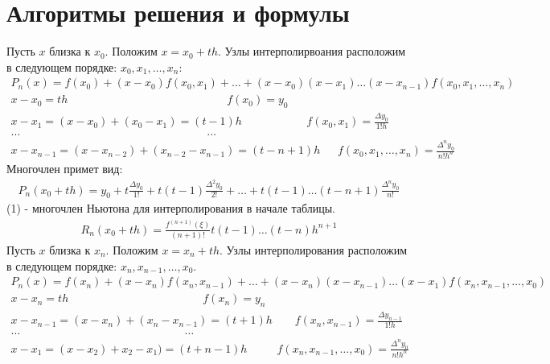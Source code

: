 \documentclass[10pt]{scrartcl}
\begin{document}
\section*{Алгоритмы решения и формулы}\noindent
Пусть $x$ близка к $x_0$. Положим $x = x_0 + th$. Узлы интерполирвоания расположим в следующем порядке: $x_0, x_1, \dots, x_n$:
\begin{gather*}
P_n(x) = f(x_0) + (x - x_0)f(x_0, x_1) + \dots + (x - x_0)(x - x_1)\dots(x - x_{n - 1})
f(x_0, x_1, \dots, x_n)\\
x - x_0 = th \ \ \ \ \ \ \ \ \ \ \ \ \ \ \ \ \ \ \ \ \ \ \ \ \ \ \ \ \ \ \ \ \ \ \ \ \ 
\ \ \ \ \ \ \ \ \ \ \ \ \ \ \ \ \ \ \ \ \ \ \ \ \ \ \ f(x_0) = y_0\\
x - x_1 = (x - x_0) + (x_0 - x_1) = (t - 1)h \ \ \ \ \ \ \ \ \ \ \ \ \ \ \ \ \ \ \ \ \ 
\ \ \ \ \ f(x_0, x_1) = \frac{\Delta y_0}{1!h}\\
\dots \ \ \ \ \ \ \ \ \ \ \ \ \ \ \ \ \ \ \ \ \ \ \ \ \ \ \ \ \ \ \ \ \ \ \ \ \ \ \ \ 
\ \ \ \ \ \ \ \ \ \ \ \ \ \ \ \ \ \ \ \ \ \ \ \ \ \ \ \ \ \ \ \ \ \ \ \dots\\
x - x_{n - 1} = (x - x_{n - 2}) + (x_{n - 2} - x_{n - 1}) = (t - n + 1)h \ \ \ \ \ \ \ 
f(x_0, x_1, \dots, x_n) = \frac{\Delta^n y_0}{n!h^n}
\end{gather*}
Многочлен примет вид:
\begin{gather}
P_n(x_0 + th) = y_0 + t\frac{\Delta y_0}{1!} + t(t - 1)\frac{\Delta^2 y_0}{2!} + \dots +
t(t - 1)\dots(t - n + 1)\frac{\Delta^n y_0}{n!}
\end{gather}
(1) - многочлен Ньютона для интерполирования в начале таблицы.
\begin{gather*}
R_n(x_0 + th) = \frac{f^{(n + 1)}(\xi)}{(n + 1)!}t(t - 1)\dots(t - n)h^{n + 1}
\end{gather*}
Пусть $x$ близка к $x_n$. Положим $x = x_n + th$. Узлы интерполирования расположим в 
следующем порядке: $x_n, x_{n - 1}, \dots, x_0$.
\begin{gather*}
P_n(x) = f(x_n) + (x - x_n)f(x_n, x_{n - 1}) + \dots + (x - x_n)(x - x_{n - 1})\dots(x - x_1)
f(x_n, x_{n - 1}, \dots, x_0)\\
x - x_n = th \ \ \ \ \ \ \ \ \ \ \ \ \ \ \ \ \ \ \ \ \ \ \ \ \ \ \ \ \ \ \ \ 
\ \ \ \ \ \ \ \ \ \ \ \ \ \ \ \ \ \ \ \ \ \ f(x_n) = y_n\\
x - x_{n - 1} = (x - x_n) + (x_n - x_{n - 1}) = (t + 1)h \ \ \ \ \ \ \ \ \ 
f(x_n, x_{n - 1}) = \frac{\Delta y_{n - 1}}{1!h}\\
\dots \ \ \ \ \ \ \ \ \ \ \ \ \ \ \ \ \ \ \ \ \ \ \ \ \ \ \ \ \ \ \ \ \ \ \ \ \ \ \ \ 
\ \ \ \ \ \ \ \ \ \ \ \ \ \ \ \ \ \ \ \ \ \ \ \ \ \ \dots\\
x - x_1 = (x - x_2) + x_2 - x_1) = (t + n - 1)h \ \ \ \ \ \ \ \ \ \ \ \
f(x_n, x_{n - 1}, \dots, x_0) = \frac{\Delta^n y_0}{n!h^n}
\end{gather*}
\end{document}
